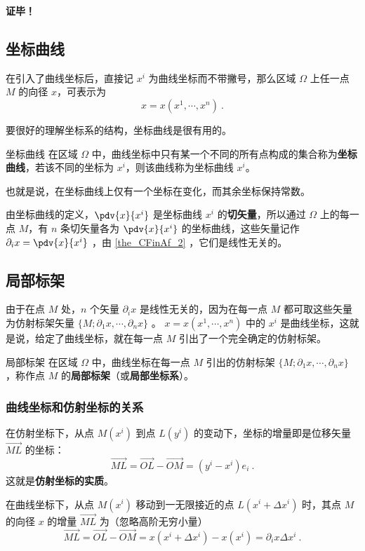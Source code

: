 \textbf{证毕！}
\subsection{坐标曲线}
在引入了曲线坐标后，直接记 $x^i$ 为曲线坐标而不带撇号，那么区域 $\Omega$ 上任一点 $M$ 的向径 $x$，可表示为
\begin{equation}
x=x(x^1,\cdots,x^n)~.
\end{equation}

要很好的理解坐标系的结构，坐标曲线是很有用的。
\begin{definition}{坐标曲线}
在区域 $\Omega$ 中，曲线坐标中只有某一个不同的所有点构成的集合称为\textbf{坐标曲线}，若该不同的坐标为 $x^i$，则该曲线称为坐标曲线 $x^i$。
\end{definition}
也就是说，在坐标曲线上仅有一个坐标在变化，而其余坐标保持常数。

由坐标曲线的定义，$\pdv{x}{x^i}$ 是坐标曲线 $x^i$ 的\textbf{切矢量}，所以通过 $\Omega$ 上的每一点 $M$，有 $n$ 条切矢量各为 $\pdv{x}{x^i}$ 的坐标曲线，这些矢量记作 $\partial_i x=\pdv{x}{x^i}$ ，由 \autoref{the_CFinAf_2} ，它们是线性无关的。
\subsection{局部标架}
由于在点 $M$ 处，$n$ 个矢量 $\partial_i x$ 是线性无关的，因为在每一点 $M$ 都可取这些矢量为仿射标架矢量 $\{M;\partial_1 x,\cdots,\partial_n x\}$ 。 $x=x(x^1,\cdots,x^n)$ 中的 $x^i$ 是曲线坐标，这就是说，给定了曲线坐标，就在每一点 $M$ 引出了一个完全确定的仿射标架。
\begin{definition}{局部标架}\label{def_CFinAf_1}
在区域 $\Omega$ 中，曲线坐标在每一点 $M$ 引出的仿射标架 $\{M;\partial_1 x,\cdots,\partial_n x\}$ ，称作点 $M$ 的\textbf{局部标架}（或\textbf{局部坐标系}）。
\end{definition} 
\subsubsection{曲线坐标和仿射坐标的关系}
在仿射坐标下，从点 $M(x^i)$ 到点 $L(y^i)$ 的变动下，坐标的增量即是位移矢量 $\overrightarrow{ML}$ 的坐标：
\begin{equation}
\overrightarrow{ML}=\overrightarrow{OL}-\overrightarrow{OM}=(y^i-x^i)e_i~.
\end{equation}
这就是\textbf{仿射坐标的实质}。

在曲线坐标下，从点 $M(x^i)$ 移动到一无限接近的点 $L(x^i+\Delta x^i)$ 时，其点 $M$ 的向径 $x$ 的增量 $\overrightarrow{ML}$ 为（忽略高阶无穷小量）
\begin{equation}\label{eq_CFinAf_4}
\overrightarrow{ML}=\overrightarrow{OL}-\overrightarrow{OM}=x(x^i+\Delta x^i)-x(x^i)=\partial_i x\Delta x^i~.
\end{equation}

